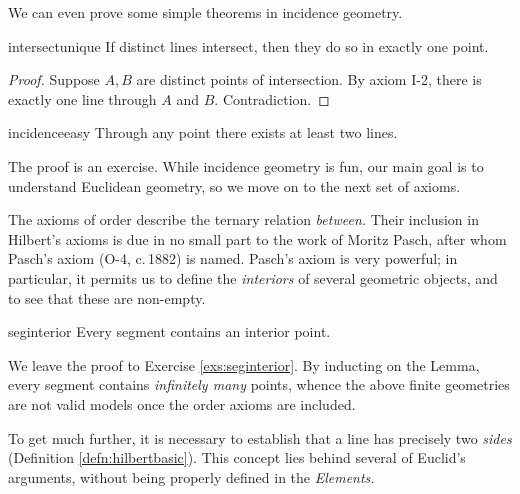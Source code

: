 We can even prove some simple theorems in incidence geometry.

\begin{lemm}{}{intersectunique}
	If distinct lines intersect, then they do so in exactly one point.
\end{lemm}

\begin{proof}
	Suppose $A,B$ are distinct points of intersection. By axiom I-2, there is exactly one line through $A$ and $B$. Contradiction.
\end{proof}

\begin{lemm}{}{incidenceeasy}
	Through any point there exists at least two lines.
\end{lemm}

The proof is an exercise. While incidence geometry is fun, our main goal is to understand Euclidean geometry, so we move on to the next set of axioms.



The axioms of order describe the ternary relation \emph{between.} Their inclusion in Hilbert's axioms is due in no small part to the work of Moritz Pasch, after whom Pasch's axiom (O-4, c.\,1882) is named. Pasch's axiom is very powerful; in particular, it permits us to define the \emph{interiors} of several geometric objects, and to see that these are non-empty.

\begin{lemm}{}{seginterior}
	Every segment contains an interior point.
\end{lemm}

We leave the proof to Exercise \ref{exs:seginterior}. By inducting on the Lemma, every segment contains \emph{infinitely many} points, whence the above finite geometries are not valid models once the order axioms are included.

\goodbreak

To get much further, it is necessary to establish that a line has precisely two \emph{sides} (Definition \ref{defn:hilbertbasic}). This concept lies behind several of Euclid's arguments, without being properly defined in the \emph{Elements.}



